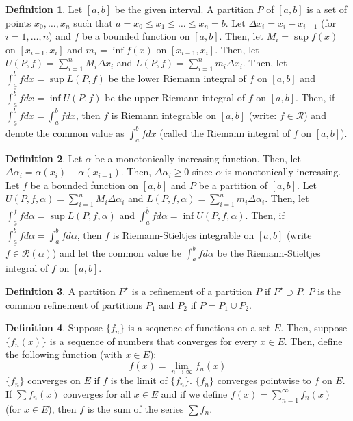 \documentclass[12pt]{article}
\theoremstyle{definition}
\newtheorem{definition}{Definition}
\theoremstyle{named}
\begin{document}
\renewcommand{\thedefinition}{6.1}
\begin{definition}
    Let $[a,b]$ be the given interval. A partition $P$ of $[a,b]$ is a set of points $x_0,\dots,x_n$ such that $a=x_0 \leq x_1 \leq \dots \leq x_n=b$. Let $\Delta x_i = x_i - x_{i-1}$ (for $i=1,\dots,n$) and $f$ be a bounded function on $[a,b]$. Then, let $M_i = \sup f(x)$ on $[x_{i-1}, x_i]$ and $m_i = \inf f(x)$ on $[x_{i-1}, x_i]$. Then, let $U(P,f) = \sum_{i=1}^{n} M_i \Delta x_i$ and $L(P,f) = \sum_{i=1}^{n} m_i \Delta x_i$. Then, let $\int_{\underline{a}}^{b} f dx = \sup L(P,f)$ be the lower Riemann integral of $f$ on $[a,b]$ and $\int_{a}^{\overline{b}} f dx = \inf U(P,f)$ be the upper Riemann integral of $f$ on $[a,b]$. Then, if $\int_{\underline{a}}^{b} f dx = \int_{a}^{\overline{b}} f dx$, then $f$ is Riemann integrable on $[a,b]$ (write: $f \in \mathscr{R}$) and denote the common value as $\int_{a}^{b} f dx$ (called the Riemann integral of $f$ on $[a,b]$). 
\end{definition}

\renewcommand{\thedefinition}{6.1}
\begin{definition}
    Let $\alpha$ be a monotonically increasing function. Then, let $\Delta \alpha_i = \alpha(x_i) - \alpha(x_{i-1})$. Then, $\Delta \alpha_i \geq 0$ since $\alpha$ is monotonically increasing. Let $f$ be a bounded function on $[a,b]$ and $P$ be a partition of $[a,b]$. Let $U(P,f,\alpha) = \sum_{i=1}^{n} M_i \Delta \alpha_i$ and $L(P,f,\alpha) = \sum_{i=1}^{n} m_i \Delta \alpha_i$. Then, let $\int_{\underline{a}}^{f} f d\alpha = \sup L(P,f,\alpha)$ and $\int_{a}^{\overline{b}} f d\alpha = \inf U(P,f,\alpha)$. Then, if $\int_{\underline{a}}^{b} f d\alpha = \int_{a}^{\overline{b}} f d\alpha$, then $f$ is Riemann-Stieltjes integrable on $[a,b]$ (write $f \in \mathscr{R}(\alpha)$) and let the common value be $\int_{a}^{b} f d\alpha$ be the Riemann-Stieltjes integral of $f$ on $[a,b]$. 
\end{definition}

\renewcommand{\thedefinition}{6.1}
\begin{definition}
    A partition $P^\star$ is a refinement of a partition $P$ if $P^\star \supset P$. $P$ is the common refinement of partitions $P_1$ and $P_2$ if $P = P_1 \cup P_2$. 
\end{definition}

\renewcommand{\thedefinition}{6.1}
\begin{definition}
    Suppose $\{f_n\}$ is a sequence of functions on a set $E$. Then, suppose $\{f_n(x)\}$ is a sequence of numbers that converges for every $x \in E$. Then, define the following function (with $x \in E$): 
    $$
    f(x) = \lim_{n \to \infty} f_n(x)
    $$
    $\{f_n\}$ converges on $E$ if $f$ is the limit of $\{f_n\}$. $\{f_n\}$ converges pointwise to $f$ on $E$. If $\sum f_n(x)$ converges for all $x \in E$ and if we define $f(x) = \sum_{n=1}^{\infty} f_n(x)$ (for $x \in E$), then $f$ is the sum of the series $\sum f_n$. 
\end{definition}
\end{document}
